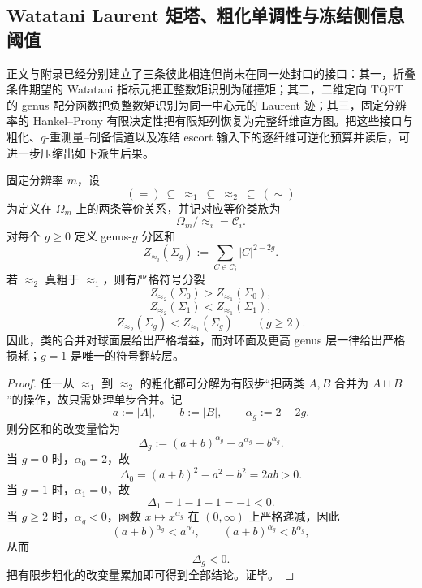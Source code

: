 \subsection{Watatani Laurent 矩塔、粗化单调性与冻结侧信息阈值}

正文与附录已经分别建立了三条彼此相连但尚未在同一处封口的接口：其一，折叠条件期望的 Watatani 指标元把正整数矩识别为碰撞矩；其二，二维定向 TQFT 的 genus 配分函数把负整数矩识别为同一中心元的 Laurent 迹；其三，固定分辨率的 Hankel--Prony 有限决定性把有限矩列恢复为完整纤维直方图。把这些接口与粗化、\(q\)-重测量--制备信道以及冻结 escort 输入下的逐纤维可逆化预算并读后，可进一步压缩出如下派生后果。

\begin{theorem}\label{thm:derived-coarsening-genus-sign-law}
固定分辨率 \(m\)，设
\[
(=)\ \subseteq\ \approx_1\ \subseteq\ \approx_2\ \subseteq\ (\sim)
\]
为定义在 \(\Omega_m\) 上的两条等价关系，并记对应等价类族为
\[
\Omega_m/\!\approx_i=\mathcal C_i.
\]
对每个 \(g\ge 0\) 定义 genus-\(g\) 分区和
\[
Z_{\approx_i}(\Sigma_g):=\sum_{C\in \mathcal C_i}|C|^{2-2g}.
\]
若 \(\approx_2\) 真粗于 \(\approx_1\)，则有严格符号分裂
\[
Z_{\approx_2}(\Sigma_0)>Z_{\approx_1}(\Sigma_0),
\]
\[
Z_{\approx_2}(\Sigma_1)<Z_{\approx_1}(\Sigma_1),
\]
\[
Z_{\approx_2}(\Sigma_g)<Z_{\approx_1}(\Sigma_g)
\qquad(g\ge 2).
\]
因此，类的合并对球面层给出严格增益，而对环面及更高 genus 层一律给出严格损耗；\(g=1\) 是唯一的符号翻转层。
\end{theorem}

\begin{proof}
任一从 \(\approx_1\) 到 \(\approx_2\) 的粗化都可分解为有限步“把两类 \(A,B\) 合并为 \(A\sqcup B\)”的操作，故只需处理单步合并。记
\[
a:=|A|,
\qquad
b:=|B|,
\qquad
\alpha_g:=2-2g.
\]
则分区和的改变量恰为
\[
\Delta_g:=(a+b)^{\alpha_g}-a^{\alpha_g}-b^{\alpha_g}.
\]
当 \(g=0\) 时，\(\alpha_0=2\)，故
\[
\Delta_0=(a+b)^2-a^2-b^2=2ab>0.
\]
当 \(g=1\) 时，\(\alpha_1=0\)，故
\[
\Delta_1=1-1-1=-1<0.
\]
当 \(g\ge 2\) 时，\(\alpha_g<0\)，函数 \(x\mapsto x^{\alpha_g}\) 在 \((0,\infty)\) 上严格递减，因此
\[
(a+b)^{\alpha_g}<a^{\alpha_g},
\qquad
(a+b)^{\alpha_g}<b^{\alpha_g},
\]
从而
\[
\Delta_g<0.
\]
把有限步粗化的改变量累加即可得到全部结论。证毕。
\end{proof}

